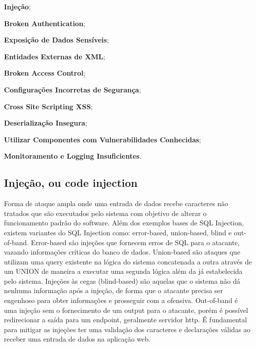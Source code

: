 \begin{alineas}

\item \textbf{Injeção};
\item \textbf{Broken Authentication};
\item \textbf{Exposição de Dados Sensíveis};
\item \textbf{Entidades Externas de XML};
\item \textbf{Broken Access Control};
\item \textbf{Configurações Incorretas de Segurança};
\item \textbf{Cross Site Scripting XSS};
\item \textbf{Deserialização Insegura};
\item \textbf{Utilizar Componentes com Vulnerabilidades Conhecidas};
\item \textbf{Monitoramento e Logging Insuficientes}.


\end{alineas}

\bigskip

\subsection{Injeção, ou code injection}
Forma de ataque ampla onde uma entrada de dados recebe caracteres não tratados que são executados pelo sistema com objetivo de alterar o funcionamento padrão do software.
Além dos exemplos bases de SQL Injection, existem variantes do SQL Injection como: error-based, union-based, blind e out-of-band. Error-based são injeções que fornecem erros de SQL para o atacante, vazando informações críticas do banco de dados. Union-based são ataques que utilizam uma query existente na lógica do sistema concatenada a outra através de um UNION de maneira a executar uma segunda lógica além da já estabelecida pelo sistema. Injeções às cegas (blind-based) são aquelas que o sistema não dá nenhuma informação após a injeção, de forma que o atacante precisa ser engenhoso para obter informações e prosseguir com a ofensiva. Out-of-band é uma injeção sem o fornecimento de um output para o atacante, porém é possível redirecionar a saída para um endpoint, geralmente servidor http.
É fundamental para mitigar as injeções ter uma validação dos caracteres e declarações válidas ao receber uma entrada de dados na aplicação web.


